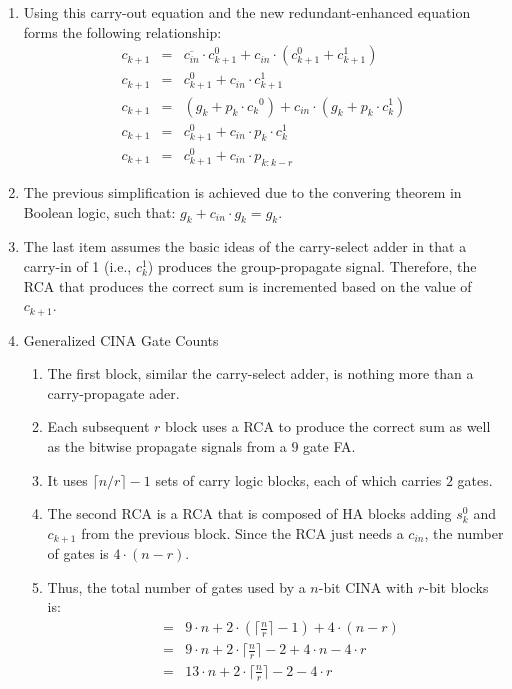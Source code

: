 \documentclass[times, twocolumn, 10pt]{article}
\begin{document}
\begin{enumerate}
\begin{enumerate}
\item Using this carry-out equation and the new redundant-enhanced equation
  forms the following relationship:
\begin{eqnarray*}
c_{k+1} & = & \overline{c_{in}} \cdot c_{k+1}^0 + c_{in} \cdot (c_{k+1}^0 +
    c_{k+1}^1) \\
c_{k+1} & = & c_{k+1}^0 + c_{in} \cdot c_{k+1}^1 \\
c_{k+1} & = & (g_k + p_k \cdot {c_k}^0) + c_{in} \cdot (g_k + p_k \cdot c_k^1)
    \\
c_{k+1} & = & c_{k+1}^0 + c_{in} \cdot p_k \cdot c_k^1 \\
c_{k+1} & = & c_{k+1}^0 + c_{in} \cdot p_{k:k-r}
\end{eqnarray*}
\item The previous simplification is achieved due to the
  convering theorem in Boolean logic, such that:  $g_k + c_{in} \cdot g_k = g_k$.
\item The last item assumes the basic ideas of the carry-select adder in that
  a carry-in of 1 (i.e., $c_k^1$) produces the group-propagate signal.
  Therefore, the RCA that produces the correct sum is incremented based on
  the value of $c_{k+1}$.
\item Generalized CINA Gate Counts
\begin{enumerate}
\item The first block, similar the carry-select adder, is nothing more than a
  carry-propagate ader.
\item Each subsequent $r$ block uses a RCA to produce the correct sum as well
  as the bitwise propagate signals from a $9$ gate FA.
\item It uses $\lceil n/r \rceil - 1$ sets of carry logic blocks, each of
  which carries $2$ gates.
\item The second RCA is a RCA that is composed of HA blocks adding $s_k^0$
  and $c_{k+1}$ from the previous block.  Since the RCA just needs a $c_{in}$,
  the number of gates is $4 \cdot (n - r)$.
\item Thus, the total number of gates used by a $n$-bit CINA with $r$-bit
  blocks is:
\begin{eqnarray*}
  & = & 9 \cdot n + 2 \cdot \left( \lceil \frac{n}{r} \rceil -1
  \right) + 4 \cdot (n - r) \\
  & = & 9 \cdot n + 2 \cdot \lceil \frac{n}{r} \rceil - 2 + 4 \cdot n
  - 4 \cdot r \\
  & = & 13 \cdot n + 2 \cdot \lceil \frac{n}{r} \rceil - 2 - 4 \cdot r
\end{eqnarray*}

\end{enumerate}
\end{enumerate}
\end{enumerate}
\end{document}
